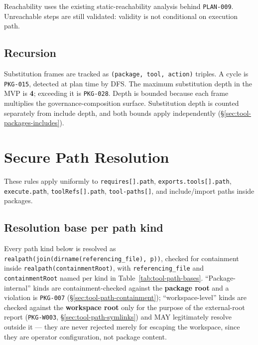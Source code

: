 Reachability uses the existing static-reachability analysis behind
\texttt{PLAN-009}. Unreachable steps are still validated: validity is not
conditional on execution path.

\subsection{Recursion}

Substitution frames are tracked as \texttt{(package, tool, action)} triples.
A cycle is \texttt{PKG-015}, detected at plan time by DFS. The maximum
substitution depth in the MVP is \textbf{4}; exceeding it is
\texttt{PKG-028}. Depth is bounded because each frame multiplies the
governance-composition surface. Substitution depth is counted separately
from include depth, and both bounds apply independently
(\S\ref{sec:tool-packages-includes}).

\section{Secure Path Resolution}
\label{sec:tool-secure-paths}

These rules apply uniformly to \texttt{requires[].path},
\texttt{exports.tools[].path}, \texttt{execute.path}, \texttt{toolRefs[].path},
\texttt{tool-paths[]}, and include/import paths inside packages.

\subsection{Resolution base per path kind}
\label{sec:tool-path-bases}

Every path kind below is resolved as
\texttt{realpath(join(dirname(referencing\_file), p))}, checked for
containment inside \texttt{realpath(containmentRoot)}, with
\texttt{referencing\_file} and \texttt{containmentRoot} named per kind in
Table~\ref{tab:tool-path-bases}. ``Package-internal'' kinds are
containment-checked against the \textbf{package root} and a violation is
\texttt{PKG-007} (\S\ref{sec:tool-path-containment}); ``workspace-level''
kinds are checked against the \textbf{workspace root} only for the purpose
of the external-root report (\texttt{PKG-W003}, \S\ref{sec:tool-path-symlinks}) and MAY legitimately resolve outside it --- they are
never rejected merely for escaping the workspace, since they are operator
configuration, not package content.

